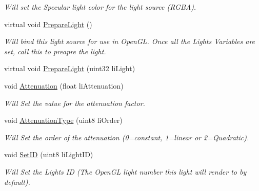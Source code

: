 \begin{DoxyCompactItemize}
\begin{DoxyCompactList}\small\item\em Will set the Specular light color for the light source (RGBA). \item\end{DoxyCompactList}\item 
virtual void \hyperlink{classc_light_a2dccfde2dd2dab941d58762f8c56b1a9}{PrepareLight} ()
\begin{DoxyCompactList}\small\item\em Will bind this light source for use in OpenGL. Once all the Lights Variables are set, call this to preapre the light. \item\end{DoxyCompactList}\item 
virtual void \hyperlink{classc_light_a9a67a4ca727ffe13ff04a87385a14e0e}{PrepareLight} (uint32 liLight)
\item 
void \hyperlink{classc_light_a9f4ef9ebd121db8ce0f23a113d48f218}{Attenuation} (float liAttenuation)
\begin{DoxyCompactList}\small\item\em Will Set the value for the attenuation factor. \item\end{DoxyCompactList}\item 
void \hyperlink{classc_light_a8394ef099b87c18df58759c8431ab084}{AttenuationType} (uint8 liOrder)
\begin{DoxyCompactList}\small\item\em Will Set the order of the attenuation (0=constant, 1=linear or 2=Quadratic). \item\end{DoxyCompactList}\item 
void \hyperlink{classc_light_a9f6bd610b772e5185fa948dfec91d865}{SetID} (uint8 liLightID)
\begin{DoxyCompactList}\small\item\em Will Set the Lights ID (The OpenGL light number this light will render to by default). \item\end{DoxyCompactList}\end{DoxyCompactItemize}
